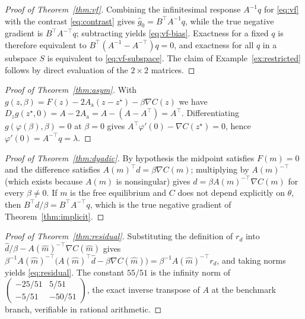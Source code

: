 \documentclass[11pt]{article}
\theoremstyle{definition}
\theoremstyle{remark}
\newcommand{\grad}{\nabla}
\begin{document}
\begin{proof}[Proof of Theorem~\ref{thm:vf}]
Combining the infinitesimal response $A^{-1}q$ for \eqref{eq:vf} with the contrast
\eqref{eq:contrast} gives $\widehat g_0 = B^{\top}A^{-1}q$, while the true negative gradient is
$B^{\top}A^{-\top}q$; subtracting yields \eqref{eq:vf-bias}. Exactness for a fixed $q$ is
therefore equivalent to $B^{\top}(A^{-1}-A^{-\top})q = 0$, and exactness for all $q$ in a
subspace $S$ is equivalent to \eqref{eq:vf-subspace}. The claim of
Example~\ref{ex:restricted} follows by direct evaluation of the $2\times2$ matrices.
\end{proof}

\begin{proof}[Proof of Theorem~\ref{thm:asym}]
With $g(z,\beta) = F(z) - 2A_{\mathrm a}(z-z^\star) - \beta\grad C(z)$ we have
$D_z g(z^\star,0) = A - 2A_{\mathrm a} = A - (A - A^{\top}) = A^{\top}$. Differentiating
$g(\varphi(\beta),\beta) = 0$ at $\beta = 0$ gives $A^{\top}\varphi'(0) - \grad C(z^\star) = 0$,
hence $\varphi'(0) = A^{-\top}q = \lambda$.
\end{proof}

\begin{proof}[Proof of Theorem~\ref{thm:dyadic}]
By hypothesis the midpoint satisfies $F(m) = 0$ and the difference satisfies
$A(m)^{\top}d = \beta\grad C(m)$; multiplying by $A(m)^{-\top}$ (which exists because $A(m)$ is
nonsingular) gives $d = \beta A(m)^{-\top}\grad C(m)$ for every $\beta \neq 0$. If $m$ is the free
equilibrium and $C$ does not depend explicitly on $\theta$, then
$B^{\top}d/\beta = B^{\top}A^{-\top}q$, which is the true negative gradient of
Theorem~\ref{thm:implicit}.
\end{proof}

\begin{proof}[Proof of Theorem~\ref{thm:residual}]
Substituting the definition of $r_d$ into
$\widehat d/\beta - A(\widehat m)^{-\top}\grad C(\widehat m)$ gives
$\beta^{-1}A(\widehat m)^{-\top}\bigl(A(\widehat m)^{\top}\widehat d - \beta \grad C(\widehat m)\bigr)
= \beta^{-1}A(\widehat m)^{-\top}r_d$, and taking norms yields \eqref{eq:residual}. The constant
$55/51$ is the infinity norm of $\begin{pmatrix} -25/51 & 5/51 \\ -5/51 & -50/51 \end{pmatrix}$,
the exact inverse transpose of $A$ at the benchmark branch, verifiable in rational arithmetic.
\end{proof}
\end{document}
